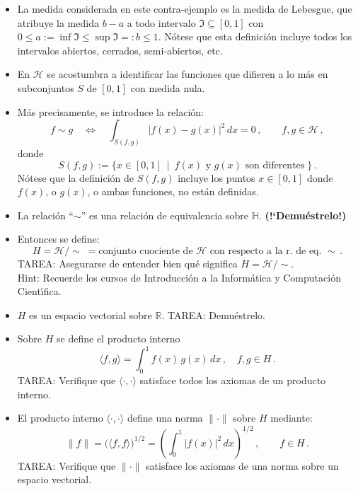 \begin{enumerate}
\begin{itemize}
\item
La medida considerada en este contra-ejemplo es la medida de Lebesgue,
que atribuye la medida $b-a$ a todo intervalo
$\mathfrak{I}\subseteq[0,1]$ con 
$0\leq a:=\inf\mathfrak{I}\leq\sup\mathfrak{I}=:b\leq1$.
N\'otese que esta definici\'on incluye todos los intervalos abiertos,
cerrados, semi-abiertos, etc.

\item
En $\mathcal{H}$ se acostumbra a identificar las funciones que
difieren a lo m\'as en subconjuntos $S$ de $[0,1]$ con medida nula.

\item
M\'as precisamente, se introduce la relaci\'on:
$$
f\sim g \quad\Leftrightarrow\quad
\int_{S(f,g)} |f(x)-g(x)|^2\,dx=0\,,\qquad f,g\in\mathcal{H}\,,
$$
donde
$$
S(f,g):=\big\{ x\in[0,1]\ \mid\ 
\text{$f(x)$ y $g(x)$ son diferentes}\;\big\}\,.
$$
N\'otese que la definici\'on de $S(f,g)$ incluye los puntos
$x\in[0,1]$ donde $f(x)$, o $g(x)$, o ambas funciones, no est\'an
definidas.

\item
La relaci\'on ``$\sim$'' es una relaci\'on de equivalencia sobre
$\mathbb{H}$. {\bf (!`Demu\'estrelo!)}

\item
Entonces se define:
$$
H = \mathcal{H}/\!\!\sim\; 
= \text{conjunto cuociente de $\mathcal{H}$ 
        con respecto a la r. de eq. $\sim$}\,.
$$
TAREA: Asegurarse de entender bien qu\'e significa
$H = \mathcal{H}/\!\!\sim$. \\
Hint: Recuerde los cursos de Introducci\'on a
la Inform\'atica y Computaci\'on Cient\'\i fica.

\item
$H$ es un espacio vectorial sobre $\mathbb{R}$.
TAREA: Demu\'estrelo.

\item
Sobre $H$ se define el producto interno
$$
\langle f,g \rangle = \displaystyle \int_0^1 f(x)\,g(x)\,dx\,,\quad
f,g\in H\,.
$$
TAREA: Verifique que $\langle\cdot,\cdot\rangle$ satisface todos los
axiomas de un producto interno.

\item
El producto interno $\langle\cdot,\cdot\rangle$ define una norma
$\|\cdot\|$ sobre $H$ mediante:
$$
\|f\|=\big( \langle f,f\rangle \big)^{1/2}
= \left( \int_0^1|f(x)|^2\,dx \right)^{1/2}\,,\qquad f\in H\,.
$$
TAREA: Verifique que $\|\cdot\|$ satisface los axiomas de una norma
sobre un espacio vectorial.


\end{itemize}
\end{enumerate}
